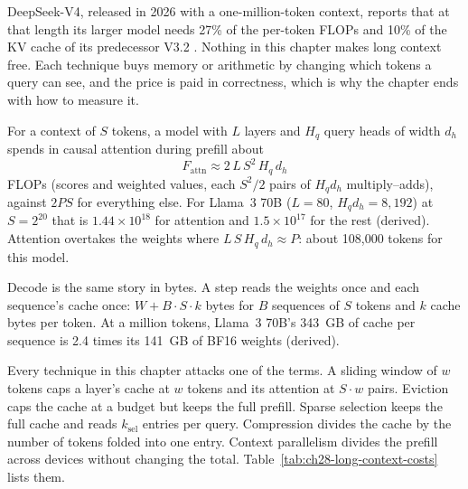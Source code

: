 DeepSeek-V4, released in 2026 with a one-million-token context, reports that
at that length its larger model needs 27\% of the per-token FLOPs and 10\% of
the KV cache of its predecessor V3.2 \cite{deepseek2026v4}. Nothing in this
chapter makes long context free. Each technique buys memory or arithmetic by
changing which tokens a query can see, and the price is paid in correctness,
which is why the chapter ends with how to measure it.



For a context of $S$ tokens, a model with $L$ layers and $H_q$ query heads of
width $d_h$ spends in causal attention during prefill about
\begin{equation}
F_{\text{attn}} \approx 2\,L\,S^{2}\,H_q\,d_h
\label{eq:attn-prefill-flops}
\end{equation}
FLOPs (scores and weighted values, each $S^2/2$ pairs of $H_q d_h$
multiply--adds), against $2PS$ for everything else. For Llama~3 70B
($L=80$, $H_q d_h = 8{,}192$) at $S = 2^{20}$ that is $1.44\times10^{18}$ for
attention and $1.5\times10^{17}$ for the rest (derived). Attention overtakes
the weights where $L\,S\,H_q\,d_h \approx P$: about 108,000 tokens for this
model.

Decode is the same story in bytes. A step reads the weights once and each
sequence's cache once: $W + B\cdot S\cdot k$ bytes for $B$ sequences of $S$
tokens and $k$ cache bytes per token. At a million tokens, Llama~3 70B's
343~GB of cache per sequence is 2.4 times its 141~GB of BF16 weights (derived).

Every technique in this chapter attacks one of the terms. A sliding window of
$w$ tokens caps a layer's cache at $w$ tokens and its attention at $S\cdot w$
pairs. Eviction caps the cache at a budget but keeps the full prefill. Sparse
selection keeps the full cache and reads $k_{\text{sel}}$ entries per query.
Compression divides the cache by the number of tokens folded into one entry.
Context parallelism divides the prefill across devices without changing the
total. Table~\ref{tab:ch28-long-context-costs} lists them.

